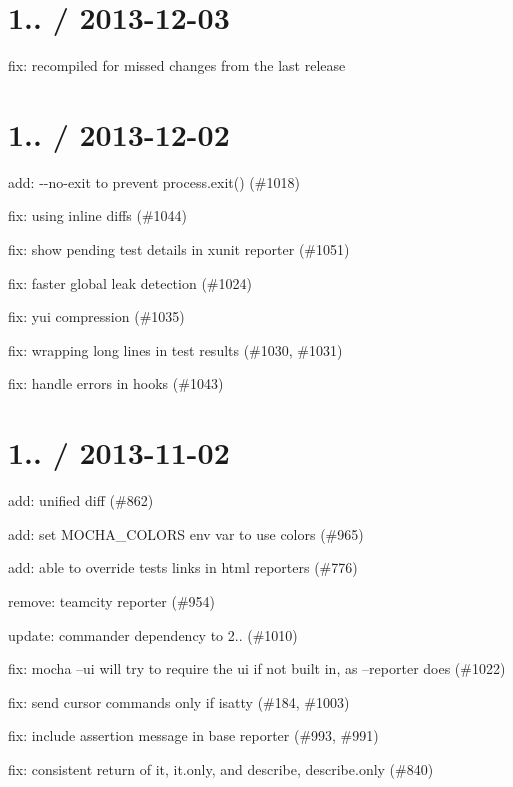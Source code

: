 \section*{1.. / 2013-\/12-\/03}


\begin{DoxyItemize}
\item fix\+: recompiled for missed changes from the last release
\end{DoxyItemize}

\section*{1.. / 2013-\/12-\/02}


\begin{DoxyItemize}
\item add\+: {\ttfamily -\/-\/no-\/exit} to prevent {\ttfamily process.\+exit()} (\#1018)
\item fix\+: using inline diffs (\#1044)
\item fix\+: show pending test details in xunit reporter (\#1051)
\item fix\+: faster global leak detection (\#1024)
\item fix\+: yui compression (\#1035)
\item fix\+: wrapping long lines in test results (\#1030, \#1031)
\item fix\+: handle errors in hooks (\#1043)
\end{DoxyItemize}

\section*{1.. / 2013-\/11-\/02}


\begin{DoxyItemize}
\item add\+: unified diff (\#862)
\item add\+: set M\+O\+C\+H\+A\+\_\+\+C\+O\+L\+O\+RS env var to use colors (\#965)
\item add\+: able to override tests links in html reporters (\#776)
\item remove\+: teamcity reporter (\#954)
\item update\+: commander dependency to 2.. (\#1010)
\item fix\+: mocha --ui will try to require the ui if not built in, as --reporter does (\#1022)
\item fix\+: send cursor commands only if isatty (\#184, \#1003)
\item fix\+: include assertion message in base reporter (\#993, \#991)
\item fix\+: consistent return of it, it.\+only, and describe, describe.\+only (\#840)
\end{DoxyItemize}

